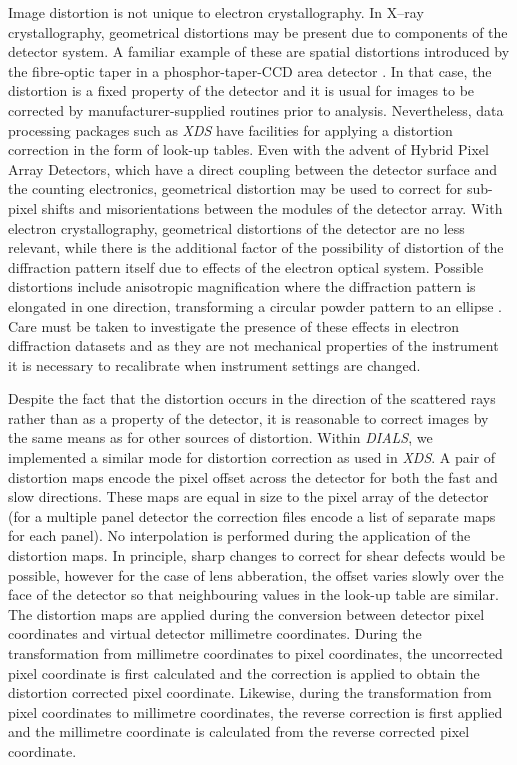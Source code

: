 \documentclass[preprint]{iucr}
\newcommand{\dials}{\emph{DIALS}\xspace}
\newcommand{\xds}{\emph{XDS}\xspace}
\begin{document}
Image distortion is not unique to electron crystallography. In X--ray
crystallography, geometrical distortions may be present due to components
of the detector system. A familiar example of these are spatial distortions
introduced by the fibre-optic taper in a phosphor-taper-CCD area detector
\cite{Stanton1992}. In that case, the distortion is a fixed property of the
detector and it is usual for images to be corrected by manufacturer-supplied
routines prior to analysis. Nevertheless, data processing packages such as \xds
have facilities for applying a distortion correction in the form of look-up
tables. Even with the advent of Hybrid Pixel Array Detectors, which have a
direct coupling between the detector surface and the counting electronics,
geometrical distortion may be used to correct for sub-pixel shifts and
misorientations between the modules of the detector array. With electron
crystallography, geometrical distortions of the detector are no less relevant,
while there is the additional factor of the possibility of distortion of
the diffraction pattern itself due to effects of the electron optical system.
Possible distortions include
anisotropic magnification where the diffraction pattern is elongated
in one direction, transforming a circular powder pattern to an ellipse
\cite{lenscorr_2dx:2006,Clabbers2017}. Care must be taken to investigate the
presence of these effects in electron diffraction datasets and as they are
not mechanical properties of the instrument it is necessary to recalibrate
when instrument settings are changed.

Despite the fact that the distortion occurs in the direction of the scattered
rays rather than as a property of the detector,
it is reasonable to correct images by the same means as for other sources of
distortion. Within \dials, we implemented a similar mode
for distortion correction as used in \xds. A pair of distortion maps encode the
pixel offset across the detector for both the fast and slow directions. These
maps are equal in size to the pixel array of the detector (for a multiple panel
detector the correction files encode a list of separate maps for each panel).
No interpolation is performed during the application of the distortion maps. In
principle, sharp changes to correct for shear defects would be possible,
however for the case of lens abberation, the offset varies slowly over the face
of the detector so that neighbouring values in the look-up table are similar.
The distortion maps are applied during the conversion between detector pixel
coordinates and virtual detector millimetre coordinates. During the
transformation from millimetre coordinates to pixel coordinates, the
uncorrected pixel coordinate is first calculated and the correction is applied
to obtain the distortion corrected pixel coordinate. Likewise, during the
transformation from pixel coordinates to millimetre coordinates, the reverse
correction is first applied and the millimetre coordinate is calculated from
the reverse corrected pixel coordinate.
\end{document}
